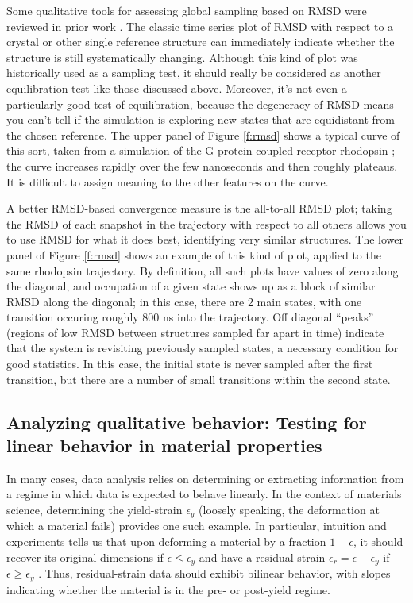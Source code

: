 Some qualitative tools for assessing global sampling based on RMSD were reviewed
in prior work \cite{Grossfield2009}.   The classic time series plot of RMSD with
respect to a crystal or other single reference structure can immediately
indicate whether the structure is still systematically changing.  Although this
kind of plot was historically used as a sampling test, it should really be
considered as another equilibration test like those discussed above.  Moreover,
it's not even a particularly good test of equilibration, because the degeneracy
of RMSD means you can't tell if the simulation is exploring new states that are
equidistant from the chosen reference.  The upper panel of Figure \ref{f:rmsd}
shows a typical curve of this sort, taken from a simulation of the G
protein-coupled receptor rhodopsin \cite{Grossfield-2015}; the curve increases
rapidly over the few nanoseconds and then roughly plateaus.  It is difficult to
assign meaning to the other features on the curve.

A better RMSD-based convergence measure is the all-to-all RMSD plot; taking the
RMSD of each snapshot in the trajectory with respect to all others allows you to
use RMSD for what it does best, identifying very similar structures.  The lower
panel of Figure \ref{f:rmsd} shows an example of this kind of plot, applied to
the same rhodopsin trajectory.  By definition, all such plots have values of zero
along the diagonal, and occupation of a given state shows up as a block of
similar RMSD along the diagonal; in this case, there are 2 main states, with one
transition occuring roughly 800 ns into the trajectory.  Off diagonal ``peaks''
(regions of low RMSD between structures sampled far apart in time) indicate that
the system is revisiting previously sampled states, a necessary condition for
good statistics.  In this case, the initial state is never sampled after the
first transition, but there are a number of small transitions within the second
state.

\subsection{Analyzing qualitative behavior: Testing for linear behavior in material properties}


In many cases, data analysis relies on determining or extracting information from a regime in which data is expected to behave linearly.  In the context of materials science, determining the yield-strain $\epsilon_y$ (loosely speaking, the deformation at which a material fails) provides one such example.  In particular, intuition and experiments tells us that upon deforming a material by a fraction $1+\epsilon$, it should recover its original dimensions if $\epsilon \le \epsilon_y$ and have a residual strain $\epsilon_r = \epsilon - \epsilon_y$ if $\epsilon \ge \epsilon_y$ \cite{patrone2}.  Thus, residual-strain data should exhibit bilinear behavior, with slopes indicating whether the material is in the pre- or post-yield regime.

